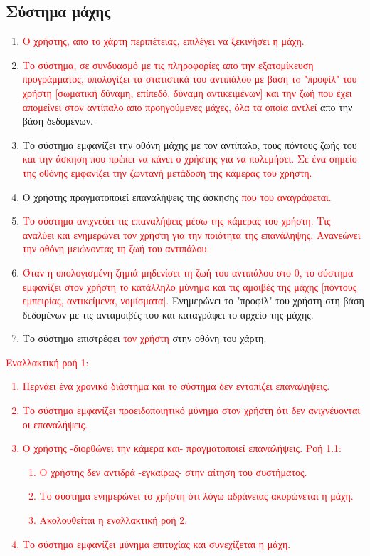 \subsection{Σύστημα μάχης}
\label{sec:solo}
\begin{enumerate}
    \item \textcolor{red}{Ο χρήστης, απο το χάρτη περιπέτειας, επιλέγει να ξεκινήσει η μάχη.}
    \item \textcolor{red}{Το σύστημα, σε συνδυασμό με τις πληροφορίες απο την εξατομίκευση προγράμματος, υπολογίζει τα στατιστικά του αντιπάλου με βάση τo "προφίλ" του χρήστη [σωματική δύναμη, επίπεδό, δύναμη αντικειμένων] και την ζωή που έχει απομείνει στον αντίπαλο απο προηγούμενες μάχες, όλα τα οποία αντλεί} απο την βάση δεδομένων.
    \item Το σύστημα εμφανίζει την οθόνη μάχης με τον αντίπαλο, τους πόντους ζωής του \textcolor{red}{και την άσκηση που πρέπει να κάνει ο χρήστης για να πολεμήσει. Σε ένα σημείο της οθόνης εμφανίζει την ζωντανή μετάδοση της κάμερας του χρήστη.}
    \item Ο χρήστης πραγματοποιεί επαναλήψεις της άσκησης \textcolor{red}{που του αναγράφεται.}
    \item \textcolor{red}{Το σύστημα ανιχνεύει τις επαναλήψεις μέσω της κάμερας του χρήστη. Τις αναλύει και ενημερώνει τον χρήστη για την ποιότητα της επανάληψης. Ανανεώνει την οθόνη μειώνοντας τη ζωή του αντιπάλου.}
    \item \textcolor{red}{Όταν η υπολογισμένη ζημιά μηδενίσει τη ζωή του αντιπάλου στο 0, το σύστημα εμφανίζει στον χρήστη το κατάλληλο μύνημα και τις αμοιβές της μάχης [πόντους εμπειρίας, αντικείμενα, νομίσματα].} Ενημερώνει το "προφίλ" του χρήστη στη βάση δεδομένων με τις ανταμοιβές του και καταγράφει το αρχείο της μάχης.
    \item Το σύστημα επιστρέφει \textcolor{red}{τον χρήστη} στην οθόνη του χάρτη.
\end{enumerate}

\textcolor{red}{
Εναλλακτική ροή 1:
\begin{enumerate}[label=5.\alph*.,ref=5.\alph*]
    \item Περνάει ένα χρονικό διάστημα και το σύστημα δεν εντοπίζει επαναλήψεις.
    \item Το σύστημα εμφανίζει προειδοποιητικό μύνημα στον χρήστη ότι δεν ανιχνέυονται οι επαναλήψεις.
    \item Ο χρήστης -διορθώνει την κάμερα και- πραγματοποιεί επαναλήψεις.
     Ροή 1.1:
    \begin{enumerate}[label=5.3.\alph*.,ref=5.3.\alph*]
        \item Ο χρήστης δεν αντιδρά -εγκαίρως- στην αίτηση του συστήματος.
        \item Το σύστημα ενημερώνει το χρήστη ότι λόγω αδράνειας ακυρώνεται η μάχη.
        \item Ακολουθείται η εναλλακτική ροή 2.
    \end{enumerate}
    \item Το σύστημα εμφανίζει μύνημα επιτυχίας και συνεχίζεται η μάχη.
\end{enumerate}
}

